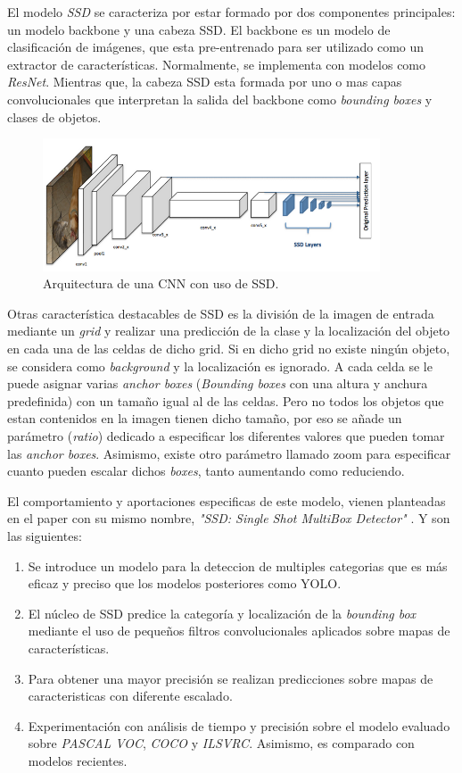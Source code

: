 El modelo \textit{SSD} se caracteriza por estar formado por dos componentes principales: un modelo backbone y una cabeza SSD. El backbone es un modelo de clasificación de imágenes, que esta pre-entrenado para ser utilizado como un extractor de características. Normalmente, se implementa con modelos como \textit{ResNet}. Mientras que, la cabeza SSD esta formada por uno o mas capas convolucionales que interpretan la salida del backbone como \textit{bounding boxes} y clases de objetos. \cite{ssdwork}

\begin{figure}[htp]
	\centering
	\includegraphics[width=10cm]{imagenes/cnnssd.png}
	\caption{Arquitectura de una CNN con uso de SSD.}
	\label{fig:ssd}
\end{figure}

Otras característica destacables de SSD es la división de la imagen de entrada mediante un \textit{grid} y realizar una predicción de la clase y la localización del objeto en cada una de las celdas de dicho grid. Si en dicho grid no existe ningún objeto, se considera como \textit{background} y la localización es ignorado. A cada celda se le puede asignar varias \textit{anchor boxes} (\textit{Bounding boxes} con una altura y anchura predefinida) con un tamaño igual al de las celdas. Pero no todos los objetos que estan contenidos en la imagen tienen dicho tamaño, por eso se añade un parámetro (\textit{ratio}) dedicado a especificar los diferentes valores que pueden tomar las \textit{anchor boxes}. Asimismo, existe otro parámetro llamado zoom para especificar cuanto pueden escalar dichos \textit{boxes}, tanto aumentando como reduciendo.\cite{ssdwork}

El comportamiento y aportaciones especificas de este modelo, vienen planteadas en el paper con su mismo nombre, \textit{"SSD: Single Shot MultiBox Detector"} \cite{ssd}. Y son las siguientes:

\begin{enumerate}
	\item Se introduce un modelo para la deteccion de multiples categorias que es más eficaz y preciso que los modelos posteriores como YOLO.
	\item El núcleo de SSD predice la categoría y localización de la \textit{bounding box} mediante el uso de pequeños filtros convolucionales aplicados sobre mapas de características.
	\item Para obtener una mayor precisión se realizan predicciones sobre mapas de caracteristicas con diferente escalado.
	\item Experimentación con análisis de tiempo y precisión sobre el modelo evaluado sobre \textit{PASCAL VOC}, \textit{COCO} y \textit{ILSVRC}. Asimismo, es comparado con modelos recientes.
\end{enumerate}

